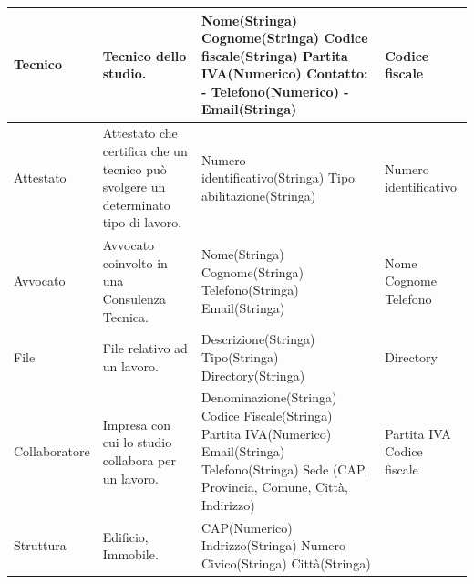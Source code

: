 \documentclass{elegantbook}
\begin{document}
\begin{longtable}{|p{2cm}|p{4.6cm}|p{6.2cm}|p{3.2cm}|}
            \hline
            Tecnico 
		& Tecnico dello studio. 
		& Nome(Stringa) 
		\newline Cognome(Stringa) 
		\newline Codice fiscale(Stringa) 
		\newline Partita IVA(Numerico) 
		\newline Contatto: 
		\newline - Telefono(Numerico) 
		\newline - Email(Stringa) 
		\newline 
		& Codice fiscale \\
            \hline
            Attestato 
		& Attestato che certifica che un tecnico può svolgere un determinato tipo di lavoro. 
		& Numero identificativo(Stringa) 
		\newline Tipo abilitazione(Stringa) 
		& Numero identificativo \\
            \hline
            Avvocato 
		& Avvocato coinvolto in una Consulenza Tecnica. 
		& Nome(Stringa) 
		\newline Cognome(Stringa) 
		\newline Telefono(Stringa) 
		\newline Email(Stringa)
		& Nome 
		\newline Cognome 
		\newline Telefono \\
            \hline
            File 
		& File relativo ad un lavoro. 
		& Descrizione(Stringa) 
		\newline Tipo(Stringa) 
		\newline Directory(Stringa)
		& Directory \\
            \hline
            Collaboratore 
		& Impresa con cui lo studio collabora per un lavoro. 
		& Denominazione(Stringa) 
		\newline Codice Fiscale(Stringa) 
		\newline Partita IVA(Numerico) 
		\newline Email(Stringa) 
		\newline Telefono(Stringa) 
		\newline Sede (CAP, Provincia, Comune, Città, Indirizzo) 
		& Partita IVA 
		\newline Codice fiscale \\
            \hline
            Struttura 
		& Edificio, Immobile. 
		& CAP(Numerico)
		\newline Indrizzo(Stringa)
		\newline Numero Civico(Stringa)
		\newline Città(Stringa) 

\end{longtable}
\end{document}
